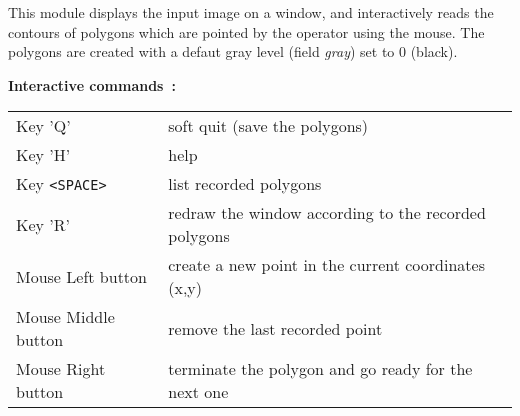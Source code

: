 This module displays the input image on a window, and interactively reads the 
contours of polygons which are pointed by the operator using the mouse.
The polygons are created with a defaut gray level (field {\em gray})
set to 0 (black).

\medskip

{\bf Interactive commands~:}
\medskip

\begin{tabular}{ll}
Key 'Q'			& soft quit (save the polygons) \\
Key 'H'			& help \\
Key \verb+<SPACE>+	& list recorded polygons \\
Key 'R'			& redraw the window according to the recorded 
polygons\\
Mouse Left button 	& create a new point in the current coordinates (x,y)\\
Mouse Middle button 	& remove the last recorded point\\
Mouse Right button	& terminate the polygon and go ready for the next one\\
\end{tabular}

